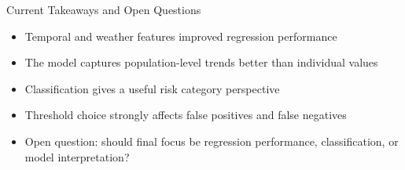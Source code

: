 \begin{frame}{Current Takeaways and Open Questions}

\begin{itemize}
    \item Temporal and weather features improved regression performance
    \item The model captures population-level trends better than individual values
    \item Classification gives a useful risk category perspective
    \item Threshold choice strongly affects false positives and false negatives
    \item Open question: should final focus be regression performance, classification, or model interpretation?
\end{itemize}

\end{frame}